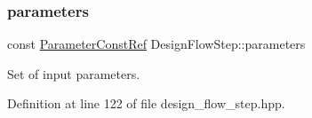 \mbox{\label{classDesignFlowStep_a802eaafe8013df706370679d1a436949}} 
\subsubsection{\texorpdfstring{parameters}{parameters}}
{\footnotesize\ttfamily const \hyperlink{Parameter_8hpp_a37841774a6fcb479b597fdf8955eb4ea}{Parameter\+Const\+Ref} Design\+Flow\+Step\+::parameters\hspace{0.3cm}{\ttfamily [protected]}}



Set of input parameters. 



Definition at line 122 of file design\+\_\+flow\+\_\+step.\+hpp.




